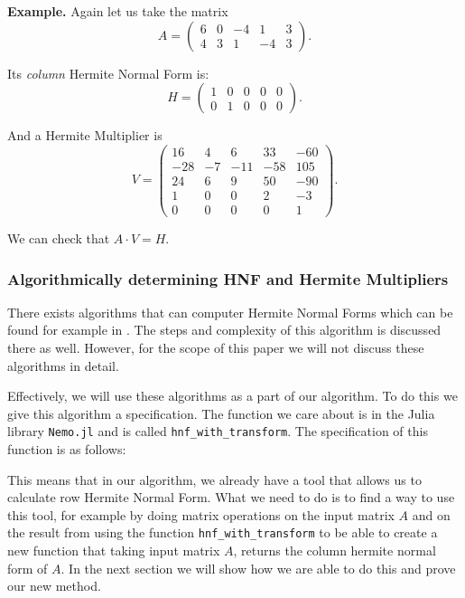 \documentclass[oneside, a4paper, onecolumn, 11pt]{article}
\newenvironment{example}[1][Example]{\textbf{#1.} }{\medskip}
\begin{document}
\begin{example}
    Again let us take the matrix
    \[
        A = \begin{pmatrix}
            6 & 0 & -4 & 1  & 3 \\
            4 & 3 & 1  & -4 & 3
        \end{pmatrix}.
    \]

    Its \textit{column} Hermite Normal Form is:
    \[
        H = \begin{pmatrix}
            1 & 0 & 0 & 0 & 0 \\
            0 & 1 & 0 & 0 & 0
        \end{pmatrix}.
    \]

    And a Hermite Multiplier is
    \[
        V = \begin{pmatrix}
            16  & 4  & 6   & 33  & -60 \\
            -28 & -7 & -11 & -58 & 105 \\
            24  & 6  & 9   & 50  & -90 \\
            1   & 0  & 0   & 2   & -3  \\
            0   & 0  & 0   & 0   & 1
        \end{pmatrix}.
    \]

    We can check that \(A \cdot V = H\).
\end{example}


\subsubsection{Algorithmically determining HNF and Hermite Multipliers}

There exists algorithms that can computer Hermite Normal Forms which can be found for example in \cite{cohen2013course}. The steps and complexity of this algorithm is discussed there as well. However, for the scope of this paper we will not discuss these algorithms in detail.

Effectively, we will use these algorithms as a part of our algorithm. To do this we give this algorithm a specification. The function we care about is in the Julia library \texttt{Nemo.jl} \cite{nemo} and is called \texttt{hnf\_with\_transform}. The specification of this function is as follows:

This means that in our algorithm, we already have a tool that allows us to calculate row Hermite Normal Form. What we need to do is to find a way to use this tool, for example by doing matrix operations on the input matrix \(A\) and on the result from using the function \texttt{hnf\_with\_transform} to be able to create a new function that taking input matrix \(A\), returns the column hermite normal form of \(A\). In the next section we will show how we are able to do this and prove our new method.
\end{document}
